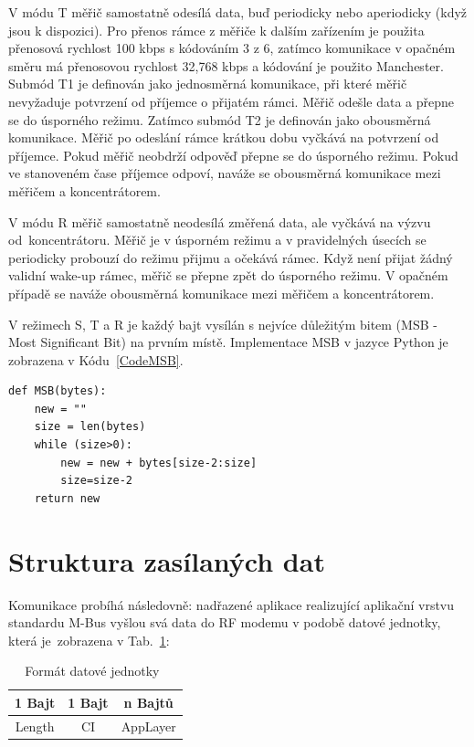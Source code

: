 V	módu T měřič samostatně odesílá data, buď periodicky nebo aperiodicky (když jsou k dispozici). Pro přenos rámce z měřiče k dalším zařízením je použita přenosová rychlost 100 kbps s kódováním 3 z 6, zatímco komunikace v opačném směru má přenosovou rychlost 32,768 kbps a kódování je použito Manchester. Submód T1 je definován jako jednosměrná komunikace, při které měřič nevyžaduje potvrzení od příjemce o přijatém rámci. Měřič odešle data a přepne se do úsporného režimu. Zatímco submód T2 je definován jako obousměrná komunikace. Měřič po odeslání rámce krátkou dobu vyčkává na potvrzení od příjemce. Pokud měřič neobdrží odpověď přepne se do úsporného režimu. Pokud ve stanoveném čase příjemce odpoví, naváže se obousměrná komunikace mezi měřičem a koncentrátorem.

V	módu R měřič samostatně neodesílá změřená data, ale vyčkává na výzvu od~koncentrátoru. Měřič je v úsporném režimu a v pravidelných úsecích se periodicky probouzí do režimu přijmu a očekává rámec. Když není přijat žádný validní wake-up rámec, měřič se přepne zpět do úsporného režimu. V	opačném případě se naváže obousměrná komunikace mezi měřičem a koncentrátorem.

V režimech S, T a R je každý bajt vysílán s nejvíce důležitým bitem (MSB - Most
Significant Bit) na prvním místě. Implementace MSB v jazyce Python je zobrazena v Kódu~\ref{CodeMSB}.

\begin{lstlisting}[caption={Implementace vyčítaní uložení MSB},captionpos=b,label=CodeMSB,style=MyCodePython]
def MSB(bytes):
    new = ""
    size = len(bytes)
    while (size>0):
        new = new + bytes[size-2:size]
        size=size-2
    return new
\end{lstlisting}


\section{Struktura zasílaných dat}
Komunikace probíhá následovně: nadřazené aplikace realizující aplikační vrstvu standardu M-Bus vyšlou svá data do RF modemu v podobě datové jednotky, která je~zobrazena v Tab.~\ref{PaketWm1}:

\begin{table}[!ht]
\vspace{-10pt}
\centering
\begin{tabular}{ccc}
1 Bajt & 1 Bajt & n Bajtů \\ \hline
\multicolumn{1}{|c|}{Length} & \multicolumn{1}{c|}{CI} & \multicolumn{1}{c|}{AppLayer} \\ \hline
\end{tabular}
\caption{Formát datové jednotky~\cite{FormatDatoveJednotky}}
\label{PaketWm1}
\vspace{-10pt}
\end{table}

